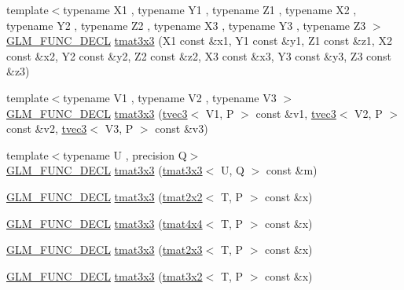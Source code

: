 \begin{DoxyCompactItemize}
\item 
{\footnotesize template$<$typename X1 , typename Y1 , typename Z1 , typename X2 , typename Y2 , typename Z2 , typename X3 , typename Y3 , typename Z3 $>$ }\\\hyperlink{setup_8hpp_ab2d052de21a70539923e9bcbf6e83a51}{G\+L\+M\+\_\+\+F\+U\+N\+C\+\_\+\+D\+E\+CL} \hyperlink{structglm_1_1detail_1_1tmat3x3_a9231c5d0ebe3a535d602e4135b9019c2}{tmat3x3} (X1 const \&x1, Y1 const \&y1, Z1 const \&z1, X2 const \&x2, Y2 const \&y2, Z2 const \&z2, X3 const \&x3, Y3 const \&y3, Z3 const \&z3)
\item 
{\footnotesize template$<$typename V1 , typename V2 , typename V3 $>$ }\\\hyperlink{setup_8hpp_ab2d052de21a70539923e9bcbf6e83a51}{G\+L\+M\+\_\+\+F\+U\+N\+C\+\_\+\+D\+E\+CL} \hyperlink{structglm_1_1detail_1_1tmat3x3_aa698f62dc4eafac9096370495dc6f74c}{tmat3x3} (\hyperlink{structglm_1_1detail_1_1tvec3}{tvec3}$<$ V1, P $>$ const \&v1, \hyperlink{structglm_1_1detail_1_1tvec3}{tvec3}$<$ V2, P $>$ const \&v2, \hyperlink{structglm_1_1detail_1_1tvec3}{tvec3}$<$ V3, P $>$ const \&v3)
\item 
{\footnotesize template$<$typename U , precision Q$>$ }\\\hyperlink{setup_8hpp_ab2d052de21a70539923e9bcbf6e83a51}{G\+L\+M\+\_\+\+F\+U\+N\+C\+\_\+\+D\+E\+CL} \hyperlink{structglm_1_1detail_1_1tmat3x3_a167e0a30ab00a30c1f3e7c528a8f4aee}{tmat3x3} (\hyperlink{structglm_1_1detail_1_1tmat3x3}{tmat3x3}$<$ U, Q $>$ const \&m)
\item 
\hyperlink{setup_8hpp_ab2d052de21a70539923e9bcbf6e83a51}{G\+L\+M\+\_\+\+F\+U\+N\+C\+\_\+\+D\+E\+CL} \hyperlink{structglm_1_1detail_1_1tmat3x3_a421b7ee49440a7e1f0a576895f6e6363}{tmat3x3} (\hyperlink{structglm_1_1detail_1_1tmat2x2}{tmat2x2}$<$ T, P $>$ const \&x)
\item 
\hyperlink{setup_8hpp_ab2d052de21a70539923e9bcbf6e83a51}{G\+L\+M\+\_\+\+F\+U\+N\+C\+\_\+\+D\+E\+CL} \hyperlink{structglm_1_1detail_1_1tmat3x3_a38cd720277c46b3768db3318960649d3}{tmat3x3} (\hyperlink{structglm_1_1detail_1_1tmat4x4}{tmat4x4}$<$ T, P $>$ const \&x)
\item 
\hyperlink{setup_8hpp_ab2d052de21a70539923e9bcbf6e83a51}{G\+L\+M\+\_\+\+F\+U\+N\+C\+\_\+\+D\+E\+CL} \hyperlink{structglm_1_1detail_1_1tmat3x3_a41ebff3cc8fb20c2e47684333186d1db}{tmat3x3} (\hyperlink{structglm_1_1detail_1_1tmat2x3}{tmat2x3}$<$ T, P $>$ const \&x)
\item 
\hyperlink{setup_8hpp_ab2d052de21a70539923e9bcbf6e83a51}{G\+L\+M\+\_\+\+F\+U\+N\+C\+\_\+\+D\+E\+CL} \hyperlink{structglm_1_1detail_1_1tmat3x3_ad518c170d44ccf4b1d2d92559a2769b6}{tmat3x3} (\hyperlink{structglm_1_1detail_1_1tmat3x2}{tmat3x2}$<$ T, P $>$ const \&x)

\end{DoxyCompactItemize}
